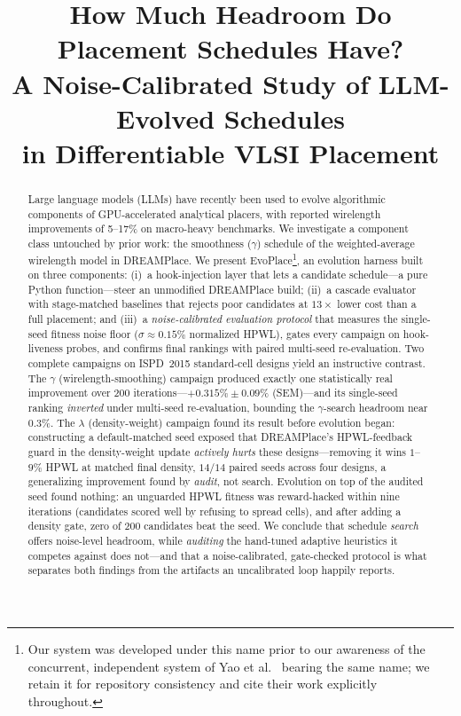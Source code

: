 \documentclass[conference]{IEEEtran}
\title{How Much Headroom Do Placement Schedules Have?\\
A Noise-Calibrated Study of LLM-Evolved Schedules\\
in Differentiable VLSI Placement}
\author{\IEEEauthorblockN{Chaithu Talasila}
\IEEEauthorblockA{Independent Researcher\\
\texttt{github.com/themoddedcube/evoplace}}}
\begin{document}
\maketitle

\begin{abstract}
Large language models (LLMs) have recently been used to evolve algorithmic
components of GPU-accelerated analytical placers, with reported wirelength
improvements of 5--17\% on macro-heavy benchmarks. We investigate a
component class untouched by prior work: the smoothness ($\gamma$) schedule
of the weighted-average wirelength model in DREAMPlace. We present
EvoPlace\footnote{Our system was developed under this name prior to our
awareness of the concurrent, independent system of Yao et
al.~\cite{yao2025evolution} bearing the same name; we retain it for
repository consistency and cite their work explicitly throughout.}, an
evolution harness built on three components: (i)~a hook-injection layer
that lets a candidate schedule---a pure Python function---steer an
unmodified DREAMPlace build; (ii)~a cascade evaluator with stage-matched
baselines that rejects poor candidates at $13\times$ lower cost than a full
placement; and (iii)~a \emph{noise-calibrated evaluation protocol} that
measures the single-seed fitness noise floor ($\sigma\!\approx\!0.15\%$
normalized HPWL), gates every campaign on hook-liveness probes, and
confirms final rankings with paired multi-seed re-evaluation. Two complete campaigns
on ISPD~2015 standard-cell designs yield an instructive contrast. The
$\gamma$ (wirelength-smoothing) campaign produced exactly one
statistically real improvement over 200 iterations---$+0.315\%\pm0.09\%$
(SEM)---and its single-seed ranking \emph{inverted} under multi-seed
re-evaluation, bounding the $\gamma$-search headroom near $0.3\%$. The
$\lambda$ (density-weight) campaign found its result before evolution
began: constructing a default-matched seed exposed that DREAMPlace's
HPWL-feedback guard in the density-weight update \emph{actively hurts}
these designs---removing it wins $1$--$9\%$ HPWL at matched final density,
$14/14$ paired seeds across four designs, a generalizing improvement found
by \emph{audit}, not search. Evolution on top of the audited seed found
nothing: an unguarded HPWL fitness was reward-hacked within nine
iterations (candidates scored well by refusing to spread cells), and after
adding a density gate, zero of 200 candidates beat the seed. We conclude
that schedule \emph{search} offers noise-level headroom, while
\emph{auditing} the hand-tuned adaptive heuristics it competes against
does not---and that a noise-calibrated, gate-checked protocol is what
separates both findings from the artifacts an uncalibrated loop happily
reports.
\end{abstract}
\end{document}
